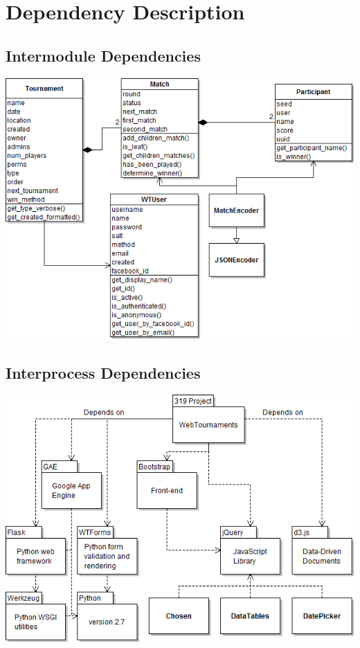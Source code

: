 \documentclass{article}
\begin{document}
\newpage
\section{Dependency Description}
\subsection{Intermodule Dependencies}
\includegraphics[width=1\textwidth]{intermodule}

\newpage
\subsection{Interprocess Dependencies}
\includegraphics[width=1\textwidth]{interprocess}
\end{document}
